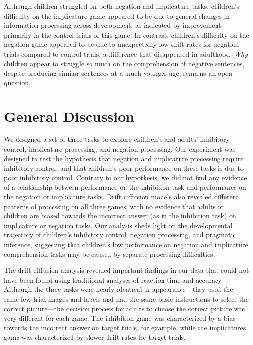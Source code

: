 \documentclass[10pt,letterpaper]{article}
\newcommand{\ejy}[1]{\textcolor{Blue}{[ejy: #1]}}
\newcommand{\aen}[1]{\textcolor{DarkOrange}{[aen: #1]}}
\begin{document}
Although children struggled on both negation and implicature tasks, children's difficulty on the implicature game appeared to be due to general changes in information processing across development, as indicated by improvement primarily in the control trials of this game. In contrast, children's difficulty on the negation game appeared to be due to unexpectedly low drift rates for negation trials compared to control trials, a difference that disappeared in adulthood. \emph{Why} children appear to struggle so much on the comprehension of negative sentences, despite producing similar sentences at a much younger age, remains an open question.


\section{General Discussion}

We designed a set of three tasks to explore children's and adults' inhibitory control, implicature processing, and negation processing. Our experiment was designed to test the hypothesis that negation and implicature processing require inhibitory control, and that children's poor performance on these tasks is due to poor inhibitory control. Contrary to our hypothesis, we did not find any evidence of a relationship between performance on the inhibition task and performance on the negation or implicature tasks. Drift diffusion models also revealed different patterns of processing on all three games, with no evidence that adults or children are biased towards the incorrect answer (as in the inhibition task) on implicature or negation tasks. Our analysis sheds light on the developmental trajectory of children's inhibitory control, negation processing, and pragmatic inference, suggesting that children's low performance on negation and implicature comprehension tasks may be caused by separate processing difficulties.

The drift diffusion analysis revealed important findings in our data that could not have been found using traditional analyses of reaction time and accuracy. Although the three tasks were nearly identical in appearance---they used the same few trial images and labels and had the same basic instructions to select the correct picture---the decision process for adults to choose the correct picture was very different for each game. The inhibition game was characterized by a bias towards the incorrect answer on target trials, for example, while the implicatures game was characterized by slower drift rates for target trials.
\end{document}
